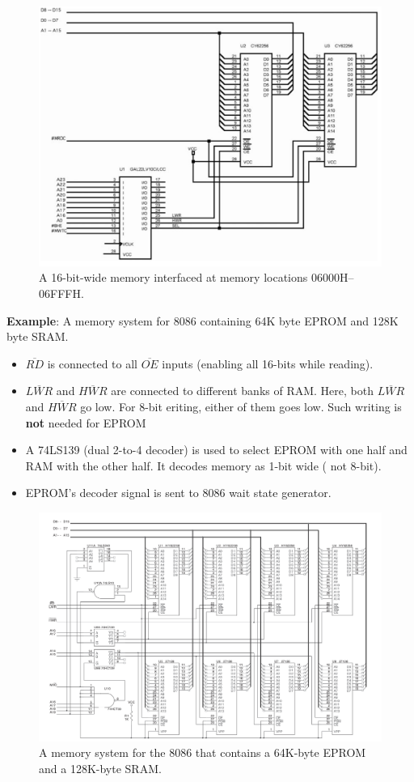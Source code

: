 \begin{figure}[h!]
  \includegraphics[width = 1.0\textwidth]{./figures/Separate_Bank.png}
  \caption{A 16-bit-wide memory interfaced at memory locations 06000H–06FFFH.}
  \label{}
\end{figure}

\textbf{Example}: A memory system for 8086 containing 64K byte EPROM and 128K byte SRAM.
\begin{itemize}
  \item $\overline{RD}$ is connected to all $\overline{OE}$ inputs (enabling all 16-bits while reading).
  \item $\overline{LWR}$ and $\overline{HWR}$ are connected to different banks of RAM. Here, both $\overline{LWR}$ and $\overline{HWR}$ go low. For 8-bit eriting, either of them goes low. Such writing is \textbf{not} needed for EPROM
  \item A 74LS139 (dual 2-to-4 decoder) is used to select EPROM with one half and RAM with the other half. It decodes memory as 1-bit wide ( not 8-bit).
  \item EPROM's decoder signal is sent to 8086 wait state generator.
\end{itemize}

\begin{figure}[h!]
  \centering
  \includegraphics[width = 1.2\textwidth]{./figures/Memory_System.png}
  \caption{A memory system for the 8086 that contains a 64K-byte EPROM and a 128K-byte SRAM.}
  \label{}
\end{figure}
